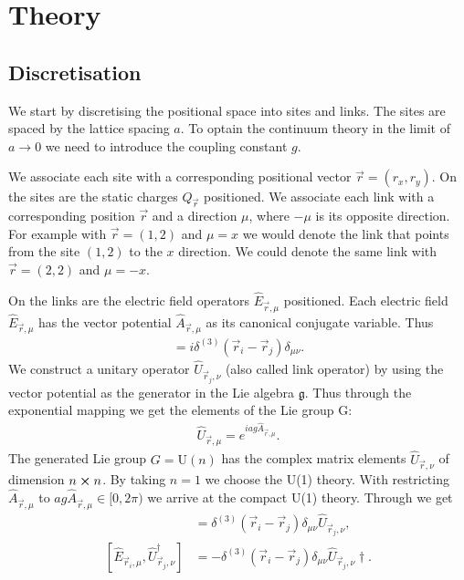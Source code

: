 \section{Theory}
\subsection{Discretisation}

We start by discretising the positional space into sites and links. The sites are spaced by the lattice spacing $a$. To optain the continuum theory in the limit of $a\rightarrow 0$ we need to introduce the coupling constant $g$\cite{RevModPhys.51.659}.

We associate each site with a corresponding positional vector $\vec{r}=(r_x, r_y)$. On the sites are the static charges $Q_{\vec{r}}$ positioned. We associate each link with a corresponding position $\vec{r}$ and a direction $\mu$, where $-\mu$ is its opposite direction. For example with $\vec{r}=(1, 2)$ and $\mu=x$ we would denote the link that points from the site $(1, 2)$ to the $x$ direction. We could denote the same link with $\vec{r}=(2, 2)$ and $\mu=-x$.

On the links are the electric field operators $\hat{E}_{\vec{r},\mu}$ positioned. Each electric field $\hat{E}_{\vec{r}, \mu}$ has the vector potential $\hat{A}_{\vec{r}, \mu}$ as its canonical conjugate variable. Thus
\begin{align}
  [\hat{E}_{\vec{r}_{i}, \mu}, \hat{A}_{\vec{r}_{j}, \nu}]=i\delta^{(3)}(\vec{r}_{i}-\vec{r}_{j})\delta_{\mu\nu}.\label{eq:com}
\end{align}
We construct a unitary operator $\hat{U}_{\vec{r}_{j}, \nu}$ (also called link operator) by using the vector potential as the generator in the Lie algebra $\mathfrak{g}$. Thus through the exponential mapping we get the elements of the Lie group G:
\begin{align}
	\hat{U}_{\vec{r}, \mu} = e^{iag\hat{A}_{\vec{r}, \mu}}.\label{eq:exp}
\end{align}
The generated Lie group $G=\text{U}(n)$ has the complex matrix elements $\hat{U}_{\vec{r}, \nu}$ of dimension $n\cross n$. By taking $n=1$ we choose the U(1) theory. With restricting $\hat{A}_{\vec{r}, \mu}$ to $ag\hat{A}_{\vec{r}, \mu}\in[0, 2\pi)$ we arrive at the compact U(1) theory. Through  we get
\begin{align}
  [\hat{E}_{\vec{r}_{i}, \mu}, \hat{U}_{\vec{r}_{j}, \nu}]      & =\delta^{(3)}(\vec{r}_{i}-\vec{r}_{j})\delta_{\mu\nu}\hat{U}_{\vec{r}_{j}, \nu},\label{eq:comu1}       \\
  [\hat{E}_{\vec{r}_{i}, \mu}, \hat{U}_{\vec{r}_{j}, \nu}^\dag] & =-\delta^{(3)}(\vec{r}_{i}-\vec{r}_{j})\delta_{\mu\nu}\hat{U}_{\vec{r}_{j}, \nu}\dag. \label{eq:comu2}
\end{align}

